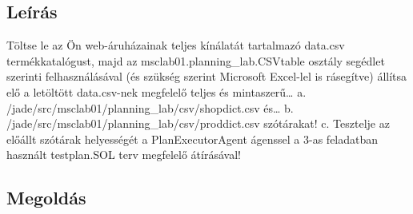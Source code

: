 \subsection{Leírás}
Töltse le az Ön web-áruházainak teljes kínálatát tartalmazó data.csv termékkatalógust, majd az msclab01.planning\_lab.CSVtable osztály segédlet szerinti felhasználásával (és szükség szerint Microsoft Excel-lel is rásegítve) állítsa elő a letöltött data.csv-nek megfelelő teljes és mintaszerű… a. /jade/src/msclab01/planning\_lab/csv/shopdict.csv és… b. /jade/src/msclab01/planning\_lab/csv/proddict.csv szótárakat! c. Tesztelje az előállt szótárak helyességét a PlanExecutorAgent ágenssel a  3-as feladatban használt testplan.SOL terv megfelelő átírásával! 
\subsection{Megoldás}



